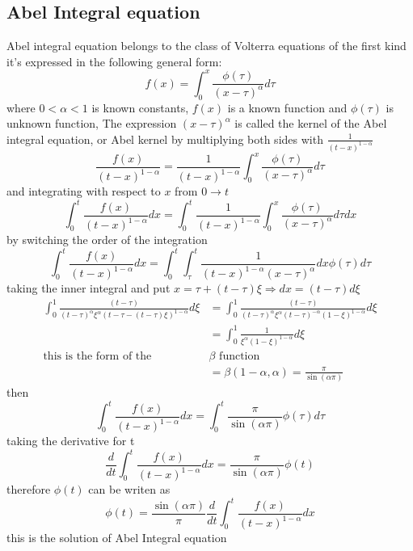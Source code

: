 \documentclass[]{article}
\begin{document}
\newpage


\subsection{Abel Integral equation}
Abel integral equation belongs to the class of Volterra equations of the first kind
it's expressed in the following general form:
\[
f(x) = \int_{0}^{x} \frac{\phi(\tau)}{{(x-\tau )}^\alpha} d\tau
\]
where $0<\alpha<1$ is known constants, $f(x)$ is a known function and $\phi(\tau)$ is unknown function,
The expression ${(x-\tau )}^\alpha$  is called the kernel of the Abel integral equation, or Abel kernel
by multiplying both sides with $\displaystyle \frac{1}{{(t-x)}^{1-\alpha}}$
\[
\frac{f(x)}{{(t-x)}^{1-\alpha}} = \frac{1}{{(t-x)}^{1-\alpha}} \int_{0}^{x} \frac{\phi(\tau)}{{(x-\tau)}^\alpha} d\tau
\]
and integrating with respect to $x$ from $0 \to t$
\[
\int_{0}^{t} \frac{f(x)}{{(t-x)}^{1-\alpha}} dx=  \int_{0}^{t} \frac{1}{{(t-x)}^{1-\alpha}} \int_{0}^{x} \frac{\phi(\tau)}{{(x-\tau)}^\alpha} d\tau dx
\]
by switching the order of the integration 
\[
\int_{0}^{t} \frac{f(x)}{{(t-x)}^{1-\alpha}} dx= \int_{0}^{t}\int_{\tau}^{t} \frac{1}{{(t-x)}^{1-\alpha}{(x-\tau)}^\alpha} dx \phi(\tau) d\tau
\]
taking the inner integral and put $x = \tau + (t-\tau)\xi \Longrightarrow dx = (t-\tau)d\xi$
\begin{align*}
    \int_{0}^{1} \frac{(t-\tau)}{{(t-\tau)}^\alpha \xi^\alpha {(t-\tau-(t-\tau)\xi)}^{1-\alpha}} d\xi 
    &= \int_{0}^{1} \frac{(t-\tau)}{{(t-\tau)}^\alpha \xi^\alpha {(t-\tau)}^{-\alpha}{(1-\xi)}^{1-\alpha}} d\xi
    \\
    &= \int_{0}^{1} \frac{1}{\xi^{\alpha} {(1-\xi)}^{1-\alpha} } d\xi
    \\
    \text{this is the form of the } &\beta \text{ function }    
    \\
    &=\beta (1-\alpha,\alpha) = \frac{\pi}{\sin(\alpha\pi)}
\end{align*}
then
\[
\int_{0}^{t} \frac{f(x)}{{(t-x)}^{1-\alpha}} dx = \int_{0}^{t} \frac{\pi}{\sin(\alpha\pi)} \phi(\tau) d\tau
\]
taking the derivative for t 
\[
\frac{d}{dt} \int_{0}^{t} \frac{f(x)}{{(t-x)}^{1-\alpha}} dx = \frac{\pi}{\sin(\alpha\pi)} \phi(t)
\]
therefore $\phi(t)$ can be writen as 
\[
\phi(t) = \frac{\sin(\alpha\pi)}{\pi}  \frac{d}{dt} \int_{0}^{t} \frac{f(x)}{{(t-x)}^{1-\alpha}} dx
\]
this is the solution of Abel Integral equation

\subsection{}
\end{document}
